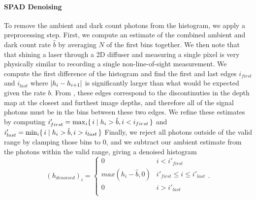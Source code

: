 \paragraph{SPAD Denoising}
To remove the ambient and dark count photons from the histogram, we apply a
preprocessing step. First, we compute an estimate of the combined ambient
and dark count rate $\hat b$ by averaging $N$ of the first bins together. We then
note that that shining a laser through a 2D diffuser and
measuring a single pixel is very physically similar to recording a single 
non-line-of-sight measurement. We
compute the first difference of the histogram and find the first and last edges 
$i_{first}$ and $i_{last}$ where $\lvert h_i - h_{i+1}\rvert$ is
significantly larger than what would be expected given the rate $b$. From
\cite{Xin2019}, these edges
correspond to the discontinuties in the depth map 
at the closest and furthest image depths, and therefore all of the signal
photons must be in the bins between these two edges. We refine these estimates by
computing $i'_{first} = \max_{i}\{\, i \mid h_i > \hat b, i < i_{first} \,\}$ and
$i'_{last} = \min_{i} \{\, i \mid h_i > \hat b, i > i_{last} \,\}$
Finally, we reject all photons outside of the valid range by clamping those bins
to 0, and we subtract our ambient estimate from the photons within the valid
range, giving a denoised histogram
\[(h_{denoised})_i = \begin{cases}
    0 & i < i'_{first} \\
    max(h_i - \hat b, 0) & i'_{first} \leq i \leq i'_{last} \\
    0 & i > i'_{last} \\
  \end{cases}.\]


